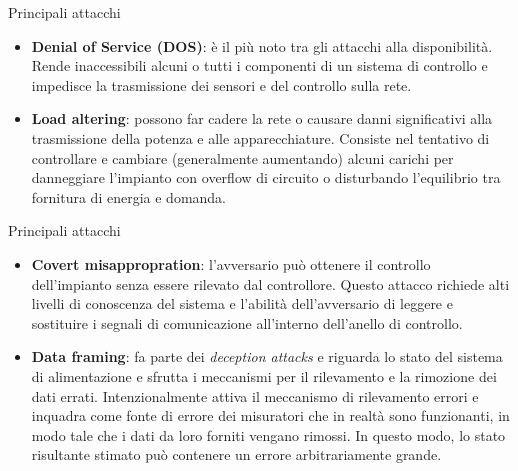 \documentclass{beamer}
\begin{document}
\begin{frame}{Principali attacchi}
    \begin{itemize}
        \item \textbf{Denial of Service (DOS)}: è il più noto tra gli attacchi alla disponibilità. Rende inaccessibili alcuni o tutti i componenti di un 
        sistema di controllo e impedisce la trasmissione dei sensori e del controllo sulla rete.
        \item \textbf{Load altering}: possono far cadere la rete o causare danni significativi alla trasmissione della potenza e alle apparecchiature.
        Consiste nel tentativo di controllare e cambiare (generalmente aumentando) alcuni carichi per danneggiare l'impianto con overflow di circuito
        o disturbando l'equilibrio tra fornitura di energia e domanda.
    \end{itemize}
\end{frame}

\begin{frame}{Principali attacchi}
    \begin{itemize}
        \item \textbf{Covert misappropration}: l'avversario può ottenere il controllo dell'impianto senza essere rilevato dal controllore. 
        Questo attacco richiede alti livelli di conoscenza del sistema e l'abilità dell'avversario di leggere e sostituire i segnali di comunicazione  
        all'interno dell'anello di controllo.
        \item \textbf{Data framing}: fa parte dei \textit{deception attacks} e riguarda lo stato del sistema di alimentazione e sfrutta i meccanismi 
        per il rilevamento e la rimozione dei dati errati. Intenzionalmente attiva il meccanismo di rilevamento errori e inquadra come fonte di errore dei
        misuratori che in realtà sono funzionanti, in modo tale che i dati da loro forniti vengano rimossi. In questo modo, lo stato risultante stimato
        può contenere un errore arbitrariamente grande. 
    \end{itemize}
\end{frame}
\end{document}
